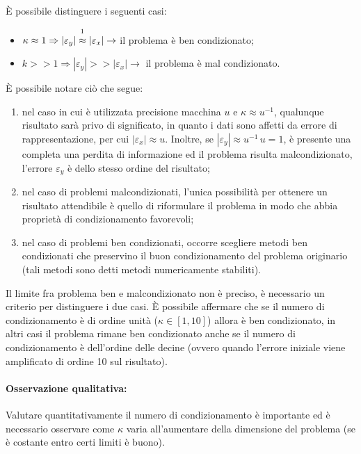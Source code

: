 È possibile distinguere i seguenti casi:
\begin{itemize}
	\item $\kappa\approx 1\Rightarrow |\varepsilon_y|\overset{\footnotemark}{\approx}|\varepsilon_x|\rightarrow$ il problema è ben condizionato;
	\item $k>>1\Rightarrow |\varepsilon_y|>>|\varepsilon_x|\rightarrow$ il problema è mal condizionato.
\end{itemize}


È possibile notare ciò che segue:
\begin{enumerate}
	\item nel caso in cui è utilizzata precisione macchina $u$ e $\kappa\approx u^{-1}$, qualunque risultato sarà privo di significato, in quanto i dati sono affetti da errore di rappresentazione, per cui $|\varepsilon_x|\approx u$. Inoltre, se $|\varepsilon_y|\approx u^{-1}\,u=1$, è presente una completa una perdita di informazione ed il problema risulta malcondizionato, l'errore $\varepsilon_y$ è dello stesso ordine del risultato;
	\item nel caso di problemi malcondizionati, l'unica possibilità per ottenere un risultato attendibile è quello di riformulare il problema in modo che abbia proprietà di condizionamento favorevoli;
	\item nel caso di problemi ben condizionati, occorre scegliere metodi ben condizionati che preservino il buon condizionamento del problema originario (tali metodi sono detti metodi numericamente stabiliti).
\end{enumerate}

Il limite fra problema ben e malcondizionato non è preciso, è necessario un criterio per distinguere i due casi. È possibile affermare che se il numero di condizionamento è di ordine unità ($\kappa\in[1,10]$) allora è ben condizionato, in altri casi il problema rimane ben condizionato anche se il numero di condizionamento è dell'ordine delle decine (ovvero quando l'errore iniziale viene amplificato di ordine 10 sul risultato).

\paragraph{Osservazione qualitativa:} Valutare quantitativamente il numero di condizionamento è importante ed è necessario osservare come $\kappa$ varia all'aumentare della dimensione del problema (se è costante entro certi limiti è buono).

